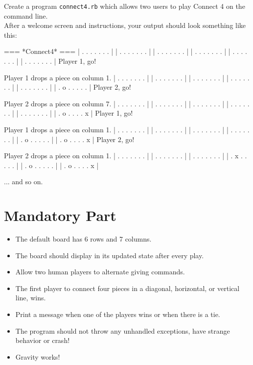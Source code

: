 \documentclass{42-en}
\begin{document}
Create a program \texttt{connect4.rb} which allows two users to play Connect 4 on the command line. \\

After a welcome screen and instructions, your output should look something like this:

\begin{42console}
=== *Connect4* ===
| . . . . . . . |
| . . . . . . . |
| . . . . . . . |
| . . . . . . . |
| . . . . . . . |
| . . . . . . . |
Player 1, go!

Player 1 drops a piece on column 1.
| . . . . . . . |
| . . . . . . . |
| . . . . . . . |
| . . . . . . . |
| . . . . . . . |
| . o . . . . . |
Player 2, go!

Player 2 drops a piece on column 7.
| . . . . . . . |
| . . . . . . . |
| . . . . . . . |
| . . . . . . . |
| . . . . . . . |
| . o . . . . x |
Player 1, go!

Player 1 drops a piece on column 1.
| . . . . . . . |
| . . . . . . . |
| . . . . . . . |
| . . . . . . . |
| . o . . . . . |
| . o . . . . x |
Player 2, go!

Player 2 drops a piece on column 1.
| . . . . . . . |
| . . . . . . . |
| . . . . . . . |
| . x . . . . . |
| . o . . . . . |
| . o . . . . x |
\end{42console}

... and so on.


\chapter{Mandatory Part}

\begin{itemize}

\item The default board has 6 rows and 7 columns.
\item The board should display in its updated state after every play.
\item Allow two human players to alternate giving commands.
\item The first player to connect four pieces in a diagonal, horizontal, or vertical line, wins.
\item Print a message when one of the players wins or when there is a tie.
\item The program should not throw any unhandled exceptions, have strange behavior or crash!
\item Gravity works!

\end{itemize}
\end{document}
